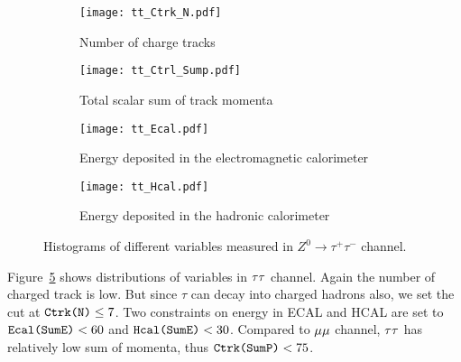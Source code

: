 \begin{figure}[H]  
	\begin{subfigure}[t]{0.5\textwidth}
	\begin{center}
		\texttt{[image: tt\_Ctrk\_N.pdf]}
	\end{center}
	\caption{Number of charge tracks}
	\label{fig:}
	\end{subfigure}%
	\begin{subfigure}[t]{0.5\textwidth}
	\begin{center}
		\texttt{[image: tt\_Ctrl\_Sump.pdf]}
	\end{center}
	\caption{Total scalar sum of track momenta}
	\label{fig:}
	\end{subfigure}
	
	\begin{subfigure}[t]{0.5\textwidth}
	\begin{center}
		\texttt{[image: tt\_Ecal.pdf]}
	\end{center}
	\caption{Energy deposited in the electromagnetic calorimeter}
	\label{fig:}
	\end{subfigure}%
	\begin{subfigure}[t]{0.5\textwidth}
	\begin{center}
		\texttt{[image: tt\_Hcal.pdf]}
	\end{center}
	\caption{Energy deposited in the hadronic calorimeter}
	\label{fig:}
	\end{subfigure}
	\caption{Histograms of different variables measured in $  {Z}^0\rightarrow \tau^+\tau^- $ channel. }
	\label{Fig:histograms_tt}
\end{figure}
Figure~\ref{Fig:histograms_tt} shows distributions of variables in $\tau\tau$ channel. Again the number of charged track is low. But since $\tau$ can decay into charged hadrons also, we set the cut at $\verb|Ctrk(N)| \leq 7$. Two constraints on energy in ECAL and HCAL are set to $\verb|Ecal(SumE)| < 60$ and $\verb|Hcal(SumE)| < 30$. Compared to $\mu\mu$ channel, $\tau\tau$ has relatively low sum of momenta, thus $\verb|Ctrk(SumP)| < 75$. 

